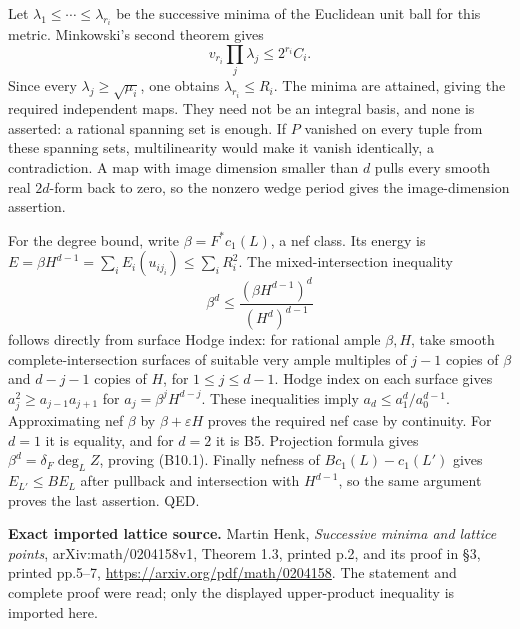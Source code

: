 Let \(\lambda_1\le\cdots\le\lambda_{r_i}\) be the successive minima of the Euclidean unit ball for this metric. Minkowski's second theorem gives \[
 v_{r_i}\prod_j\lambda_j\le 2^{r_i}C_i.
\] Since every \(\lambda_j\ge\sqrt{\mu_i}\), one obtains \(\lambda_{r_i}\le R_i\). The minima are attained, giving the required independent maps. They need not be an integral basis, and none is asserted: a rational spanning set is enough. If \(P\) vanished on every tuple from these spanning sets, multilinearity would make it vanish identically, a contradiction. A map with image dimension smaller than \(d\) pulls every smooth real \(2d\)-form back to zero, so the nonzero wedge period gives the image-dimension assertion.

For the degree bound, write \(\beta=F^*c_1(L)\), a nef class. Its energy is \(E=\beta H^{d-1}=\sum_iE_i(u_{ij_i})\le\sum_iR_i^2\). The mixed-intersection inequality \[
 \beta^d\le\frac{(\beta H^{d-1})^d}{(H^d)^{d-1}}
\tag{B10.2}
\] follows directly from surface Hodge index: for rational ample \(\beta,H\), take smooth complete-intersection surfaces of suitable very ample multiples of \(j-1\) copies of \(\beta\) and \(d-j-1\) copies of \(H\), for \(1\le j\le d-1\). Hodge index on each surface gives \(a_j^2\ge a_{j-1}a_{j+1}\) for \(a_j=\beta^jH^{d-j}\). These inequalities imply \(a_d\le a_1^d/a_0^{d-1}\). Approximating nef \(\beta\) by \(\beta+\varepsilon H\) proves the required nef case by continuity. For \(d=1\) it is equality, and for \(d=2\) it is B5. Projection formula gives \(\beta^d=\delta_F\deg_L Z\), proving (B10.1). Finally nefness of \(Bc_1(L)-c_1(L')\) gives \(E_{L'}\le B E_L\) after pullback and intersection with \(H^{d-1}\), so the same argument proves the last assertion. QED.

\textbf{Exact imported lattice source.} Martin Henk, \emph{Successive minima and lattice points}, arXiv:math/0204158v1, Theorem 1.3, printed p.2, and its proof in §3, printed pp.5--7, \url{https://arxiv.org/pdf/math/0204158}. The statement and complete proof were read; only the displayed upper-product inequality is imported here.

